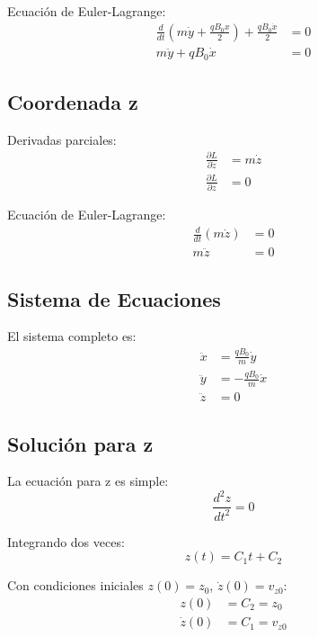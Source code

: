 \documentclass{article}
\begin{document}
Ecuación de Euler-Lagrange:
\begin{align}
\frac{d}{dt}\left(m\dot{y} + \frac{qB_0 x}{2}\right) + \frac{qB_0 \dot{x}}{2} &= 0 \\
m\ddot{y} + qB_0 \dot{x} &= 0
\end{align}

\subsection*{Coordenada z}

Derivadas parciales:
\begin{align}
\frac{\partial L}{\partial \dot{z}} &= m\dot{z} \\
\frac{\partial L}{\partial z} &= 0
\end{align}

Ecuación de Euler-Lagrange:
\begin{align}
\frac{d}{dt}(m\dot{z}) &= 0 \\
m\ddot{z} &= 0
\end{align}

\subsection*{Sistema de Ecuaciones}

El sistema completo es:
\begin{align}
\ddot{x} &= \frac{qB_0}{m} \dot{y} \\
\ddot{y} &= -\frac{qB_0}{m} \dot{x} \\
\ddot{z} &= 0
\end{align}

\subsection*{Solución para z}

La ecuación para z es simple:
\begin{equation}
\frac{d^2 z}{dt^2} = 0
\end{equation}

Integrando dos veces:
\begin{equation}
z(t) = C_1 t + C_2
\end{equation}

Con condiciones iniciales $z(0) = z_0$, $\dot{z}(0) = v_{z0}$:
\begin{align}
z(0) &= C_2 = z_0 \\
\dot{z}(0) &= C_1 = v_{z0}
\end{align}
\end{document}
